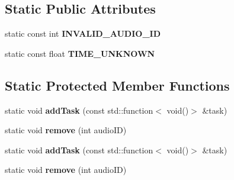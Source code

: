\subsection*{Static Public Attributes}
\begin{DoxyCompactItemize}
\item 
\mbox{\label{classexperimental_1_1AudioEngine_aa95b96db73616d5fb4c474e1252c0a3b}} 
static const int {\bfseries I\+N\+V\+A\+L\+I\+D\+\_\+\+A\+U\+D\+I\+O\+\_\+\+ID}
\item 
\mbox{\label{classexperimental_1_1AudioEngine_ac1cb64bc25bf92bb2ab578ab8e60593e}} 
static const float {\bfseries T\+I\+M\+E\+\_\+\+U\+N\+K\+N\+O\+WN}
\end{DoxyCompactItemize}
\subsection*{Static Protected Member Functions}
\begin{DoxyCompactItemize}
\item 
\mbox{\label{classexperimental_1_1AudioEngine_a08e4862df51b48eb7a045741dc8ff1f2}} 
static void {\bfseries add\+Task} (const std\+::function$<$ void()$>$ \&task)
\item 
\mbox{\label{classexperimental_1_1AudioEngine_ae4830cb6969152dc7dcddfa6edf58622}} 
static void {\bfseries remove} (int audio\+ID)
\item 
\mbox{\label{classexperimental_1_1AudioEngine_a08e4862df51b48eb7a045741dc8ff1f2}} 
static void {\bfseries add\+Task} (const std\+::function$<$ void()$>$ \&task)
\item 
\mbox{\label{classexperimental_1_1AudioEngine_ae4830cb6969152dc7dcddfa6edf58622}} 
static void {\bfseries remove} (int audio\+ID)
\end{DoxyCompactItemize}
